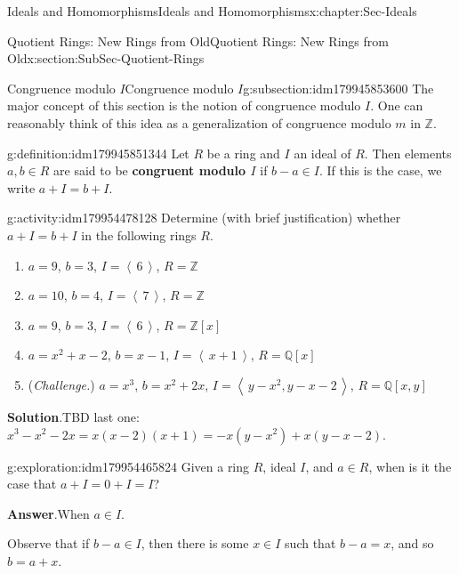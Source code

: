 \documentclass[oneside,10pt,]{book}
\newcommand{\blocktitlefont}{\relax}
\newcommand{\terminology}[1]{\textbf{#1}}
\numberwithin{equation}{section}
\newcommand{\ideal}[1]{\left\langle\, #1 \,\right\rangle}
\def\Z{{\mathbb Z}}
\def\Q{{\mathbb Q}}
\begin{document}
\begin{chapterptx}{Ideals and Homomorphisms}{}{Ideals and Homomorphisms}{}{}{x:chapter:Sec-Ideals}
\begin{sectionptx}{Quotient Rings: New Rings from Old}{}{Quotient Rings: New Rings from Old}{}{}{x:section:SubSec-Quotient-Rings}
\begin{introduction}{}
\end{introduction}%
%
%
\typeout{************************************************}
\typeout{************************************************}
%
\begin{subsectionptx}{Congruence modulo \(I\)}{}{Congruence modulo \(I\)}{}{}{g:subsection:idm179945853600}
The major concept of this section is the notion of congruence modulo \(I\). One can reasonably think of this idea as a generalization of congruence modulo \(m\) in \(\Z\).%
\begin{definition}{}{g:definition:idm179945851344}%
%
Let \(R\) be a ring and \(I\) an ideal of \(R\). Then elements \(a,b\in R\) are said to be \terminology{congruent modulo \(I\)} if \(b-a\in I\). If this is the case, we write \(a + I = b + I\).%
\end{definition}
\begin{activity}{}{g:activity:idm179954478128}%
Determine (with brief justification) whether \(a + I = b + I\) in the following rings \(R\).%
%
\begin{enumerate}
\item{}\(a = 9\), \(b = 3\), \(I = \ideal{6}\), \(R = \Z\)%
\item{}\(a = 10\), \(b = 4\), \(I = \ideal{7}\), \(R = \Z\)%
\item{}\(a = 9\), \(b = 3\), \(I = \ideal{6}\), \(R = \Z[x]\)%
\item{}\(a = x^2+x-2\), \(b = x-1\), \(I = \ideal{x+1}\), \(R = \Q[x]\)%
\item{}(\emph{Challenge.}) \(a = x^3\), \(b = x^2+2x\), \(I = \ideal{y-x^2, y-x-2}\), \(R = \Q[x,y]\)%
\end{enumerate}
\par\smallskip%
\noindent\textbf{\blocktitlefont Solution}.\hypertarget{g:solution:idm179954458608}{}\quad{}TBD last one: \(x^3 - x^2 - 2x = x(x-2)(x+1) = -x(y-x^2) + x(y-x-2)\).\end{activity}
\begin{exploration}{}{g:exploration:idm179954465824}%
Given a ring \(R\), ideal \(I\), and \(a\in R\), when is it the case that \(a + I = 0 + I = I\)?%
\par\smallskip%
\noindent\textbf{\blocktitlefont Answer}.\hypertarget{g:answer:idm179954471376}{}\quad{}When \(a\in I\).%
\end{exploration}
Observe that if \(b-a \in I\), then there is some \(x\in I\) such that \(b-a = x\), and so \(b = a+x\).%
\par

\end{subsectionptx}
\end{sectionptx}
\end{chapterptx}
\end{document}
